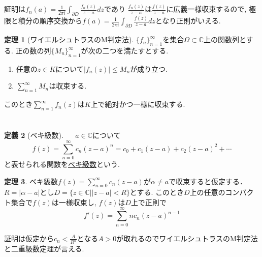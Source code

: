 \documentclass[dvipdfmx,a4paper,11pt]{article}
\newcommand{\C}{\mathbb{C}}
\theoremstyle{definition}
\newtheorem{thm}{定理}
\newtheorem{dfn}[thm]{定義}
\begin{document}
証明は$f_n(a) = \frac{1}{2 \pi i} \int_{\partial D} \frac{f_n(z)}{z - a} dz$であり $\frac{f_n(z)}{z - a}$は$\frac{f(z)}{z - a}$に広義一様収束するので, 極限と積分の順序交換から$f(a) = \frac{1}{2 \pi i} \int_{\partial D} \frac{f(z)}{z - a} dz$となり正則がいえる.
    
          \begin{tcolorbox}[
    colback = white,
    colframe = green!35!black,
    fonttitle = \bfseries,
    breakable = true]
    \begin{thm}[ワイエルシュトラスのM判定法]
$\{ f_{n}\}_{n=1}^{\infty}$を集合$\Omega \subset \C$上の関数列とする.
正の数の列$\{M_{n}\}_{n=1}^{\infty}$が次の二つを満たすとする.
\begin{enumerate}
\setlength{\parskip}{0cm} 
  \setlength{\itemsep}{0cm} 
\item 任意の$z \in K$について$|f_{n}(z)| \le M_n$が成り立つ.
\item $\sum_{n=1}^{\infty} M_{n}$は収束する.
\end{enumerate}
このとき$\sum_{n=1}^{\infty} f_{n}(z)$は$K$上で絶対かつ一様に収束する.
    \end{thm}
    \end{tcolorbox}
        
  \section{}
  
  
  \begin{tcolorbox}[
    colback = white,
    colframe = green!35!black,
    fonttitle = \bfseries,
    breakable = true]
    \begin{dfn}[ベキ級数]　
  $a \in \C$について
$$
f(z) = \sum_{n=0}^{\infty}c_n (z -a)^{n} = c_0 + c_1( z - a) + c_2(z -a)^2 + \cdots
$$
と表せられる関数を\underline{ベキ級数}という.
    \end{dfn}
    \end{tcolorbox}

\begin{tcolorbox}[
    colback = white,
    colframe = green!35!black,
    fonttitle = \bfseries,
    breakable = true]
    \begin{thm}
ベキ級数$f(z) = \sum_{n=0}^{\infty}c_n (z -a)$が$\alpha \neq a$で収束すると仮定する．
$R = |\alpha - a|$とし$D = \{ z\in \C | |z  - a| < R \}$とする.
このとき$D$上の任意のコンパクト集合で$f(z)$は一様収束し, $f(z)$は$D$上で正則で
$$
f'(z) =  \sum_{n=0}^{\infty}n c_n (z -a)^{n-1}
$$
    \end{thm}
\end{tcolorbox}
証明は仮定から$c_n < \frac{A}{R^{n}}$となる$A>0$が取れるのでワイエルシュトラスのM判定法と二重級数定理が言える.
        
\end{document}
